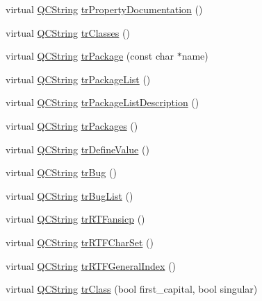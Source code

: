 \begin{DoxyCompactItemize}
virtual \mbox{\hyperlink{class_q_c_string}{Q\+C\+String}} \mbox{\hyperlink{class_translator_serbian_cyrillic_a27657957f2abf25e3d531c088c11f17d}{tr\+Property\+Documentation}} ()
\item 
virtual \mbox{\hyperlink{class_q_c_string}{Q\+C\+String}} \mbox{\hyperlink{class_translator_serbian_cyrillic_a138724316b15f8bb0761d74ef5992170}{tr\+Classes}} ()
\item 
virtual \mbox{\hyperlink{class_q_c_string}{Q\+C\+String}} \mbox{\hyperlink{class_translator_serbian_cyrillic_ae0960b5ad5aef701e94ee70f73bf24da}{tr\+Package}} (const char $\ast$name)
\item 
virtual \mbox{\hyperlink{class_q_c_string}{Q\+C\+String}} \mbox{\hyperlink{class_translator_serbian_cyrillic_a53c68048671e1ca513b441a7ee226021}{tr\+Package\+List}} ()
\item 
virtual \mbox{\hyperlink{class_q_c_string}{Q\+C\+String}} \mbox{\hyperlink{class_translator_serbian_cyrillic_a46b303143151f097f16f9dbf6670ae32}{tr\+Package\+List\+Description}} ()
\item 
virtual \mbox{\hyperlink{class_q_c_string}{Q\+C\+String}} \mbox{\hyperlink{class_translator_serbian_cyrillic_aff13357770145a573d7c64d7601ae643}{tr\+Packages}} ()
\item 
virtual \mbox{\hyperlink{class_q_c_string}{Q\+C\+String}} \mbox{\hyperlink{class_translator_serbian_cyrillic_ae924f00ec68192ba76889b26257f19b5}{tr\+Define\+Value}} ()
\item 
virtual \mbox{\hyperlink{class_q_c_string}{Q\+C\+String}} \mbox{\hyperlink{class_translator_serbian_cyrillic_aedd32ebb978bed3d6df4f2a9a0ddf659}{tr\+Bug}} ()
\item 
virtual \mbox{\hyperlink{class_q_c_string}{Q\+C\+String}} \mbox{\hyperlink{class_translator_serbian_cyrillic_a75182d535aa97bc820e764a5cec03509}{tr\+Bug\+List}} ()
\item 
virtual \mbox{\hyperlink{class_q_c_string}{Q\+C\+String}} \mbox{\hyperlink{class_translator_serbian_cyrillic_a6dcfdb3f544c2e1e32673d81c088b9e3}{tr\+R\+T\+Fansicp}} ()
\item 
virtual \mbox{\hyperlink{class_q_c_string}{Q\+C\+String}} \mbox{\hyperlink{class_translator_serbian_cyrillic_a56d543bd8cb47b0e1a08df7774bbea22}{tr\+R\+T\+F\+Char\+Set}} ()
\item 
virtual \mbox{\hyperlink{class_q_c_string}{Q\+C\+String}} \mbox{\hyperlink{class_translator_serbian_cyrillic_a4ca343d261128739b6b3140bb98a20f0}{tr\+R\+T\+F\+General\+Index}} ()
\item 
virtual \mbox{\hyperlink{class_q_c_string}{Q\+C\+String}} \mbox{\hyperlink{class_translator_serbian_cyrillic_a1cfa424ca3399d82bd2b0edd54970a1a}{tr\+Class}} (bool first\+\_\+capital, bool singular)

\end{DoxyCompactItemize}
